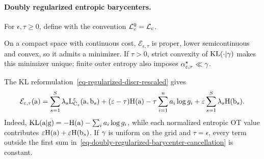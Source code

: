 \paragraph{Doubly regularized entropic barycenters.}
\begin{defn}\label{def-doubly-regularized-entropic-barycenter}
For $\epsilon,\tau\geq0$, define
with the convention $\mathcal{L}_c^0=\mathcal{L}_c$.
\end{defn}
On a compact space with continuous cost, $\mathcal E_{\epsilon,\tau}$ is proper, lower semicontinuous and convex, so it admits a minimizer. If $\tau>0$, strict convexity of $\operatorname{KL}(\cdot|\gamma)$ makes this minimizer unique; finite outer entropy also imposes $\alpha_{\varepsilon,\tau}^\star\ll\gamma$.

The KL reformulation~\eqref{eq-regularized-discr-rescaled} gives
\begin{equation}\label{eq-doubly-regularized-barycenter-cancellation}
\mathcal E_{\varepsilon,\tau}(\mathrm{a})=\sum_{s=1}^S\lambda_s\mathrm{L}_{\mathrm{C}_s}^\varepsilon(\mathrm{a},\mathrm{b}_s)+(\varepsilon-\tau)\mathrm{H}(\mathrm{a})-\tau\sum_{i=1}^n a_i\log g_i+\varepsilon\sum_{s=1}^S\lambda_s\mathrm{H}(\mathrm{b}_s).
\end{equation}
Indeed, $\mathrm{KL}(\mathrm{a}|\mathrm{g})=-\mathrm{H}(\mathrm{a})-\sum_i a_i\log g_i$, while each normalized entropic OT value contributes $\varepsilon\mathrm{H}(\mathrm{a})+\varepsilon\mathrm{H}(\mathrm{b}_s)$. If $\gamma$ is uniform on the grid and $\tau=\epsilon$, every term outside the first sum in~\eqref{eq-doubly-regularized-barycenter-cancellation} is constant.

